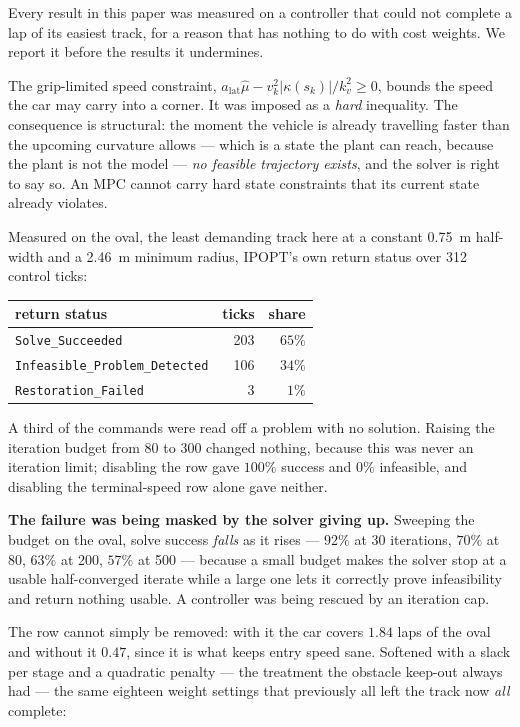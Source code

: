\documentclass[letterpaper, 10 pt, conference]{ieeeconf}
\begin{document}
Every result in this paper was measured on a controller that could not complete
a lap of its easiest track, for a reason that has nothing to do with cost
weights. We report it before the results it undermines.

The grip-limited speed constraint,
$a_{\text{lat}}\hat\mu - v_k^2|\kappa(s_k)|/k_v^2 \ge 0$, bounds the speed the
car may carry into a corner. It was imposed as a \emph{hard} inequality. The
consequence is structural: the moment the vehicle is already travelling faster
than the upcoming curvature allows --- which is a state the plant can reach,
because the plant is not the model --- \emph{no feasible trajectory exists}, and
the solver is right to say so. An MPC cannot carry hard state constraints that
its current state already violates.

Measured on the oval, the least demanding track here at a constant
\SI{0.75}{\meter} half-width and a \SI{2.46}{\meter} minimum radius, IPOPT's own
return status over 312 control ticks:

\begin{center}
\begin{tabular}{lrr}
  \toprule
  return status & ticks & share \\
  \midrule
  \texttt{Solve\_Succeeded}             & 203 & $65\%$ \\
  \texttt{Infeasible\_Problem\_Detected} & 106 & $34\%$ \\
  \texttt{Restoration\_Failed}           &   3 & $1\%$ \\
  \bottomrule
\end{tabular}
\end{center}

A third of the commands were read off a problem with no solution. Raising the
iteration budget from $80$ to $300$ changed nothing, because this was never an
iteration limit; disabling the row gave $100\%$ success and $0\%$ infeasible,
and disabling the terminal-speed row alone gave neither.

\textbf{The failure was being masked by the solver giving up.} Sweeping the
budget on the oval, solve success \emph{falls} as it rises --- $92\%$ at 30
iterations, $70\%$ at 80, $63\%$ at 200, $57\%$ at 500 --- because a small
budget makes the solver stop at a usable half-converged iterate while a large
one lets it correctly prove infeasibility and return nothing usable. A
controller was being rescued by an iteration cap.

The row cannot simply be removed: with it the car covers $1.84$ laps of the
oval and without it $0.47$, since it is what keeps entry speed sane. Softened
with a slack per stage and a quadratic penalty --- the treatment the obstacle
keep-out always had --- the same eighteen weight settings that previously all
left the track now \emph{all} complete:
\end{document}
